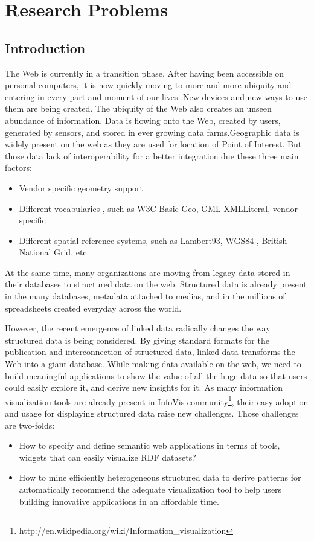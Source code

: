 \documentclass[a4paper,11pt]{report}
\begin{document}


\chapter{Research Problems}

\section{Introduction}
The Web is currently in a transition phase. After having been accessible on personal computers, it is now 
quickly moving to more and more ubiquity and entering in every part and moment of our lives. New 
devices and new ways to use them are being created. The ubiquity of the Web also creates an unseen 
abundance of information. Data is flowing onto the Web, created by users, generated by sensors, and 
stored in ever growing data farms.Geographic data is widely present on the web as they are used for location 
of Point of Interest. But those data lack of interoperability for a better integration due these three main factors:
\begin{itemize}
\item Vendor specific geometry support
\item Different vocabularies , such as W3C Basic Geo, GML XMLLiteral, vendor-specific
\item Different spatial reference systems, such as Lambert93, WGS84 , British National Grid, etc.
\end{itemize}
At the same time, many organizations are moving from legacy data stored in their databases
to structured data on the web. Structured data is already present in the many databases, metadata attached to medias, and in the millions of spreadsheets created everyday across the world. 

However, the recent emergence of linked data radically changes the way structured data is being considered. By giving standard formats for the publication and interconnection of structured data, linked data transforms the Web into a giant database. While making data available on the web, we need to build meaningful applications to show the value of all the huge data so that users could easily explore it, and derive new insights for it. As many information visualization tools are already present in InfoVis community\footnote{http://en.wikipedia.org/wiki/Information\_visualization}, their easy adoption and usage for displaying structured data raise new challenges. Those challenges are two-folds:
\begin{itemize}
\item How to specify and define semantic web applications in terms of tools, widgets that can easily visualize RDF datasets?
\item How to mine efficiently heterogeneous structured data to derive patterns for automatically recommend the adequate visualization tool to help users building innovative applications in an affordable time.
\end{itemize}
\end{document}
